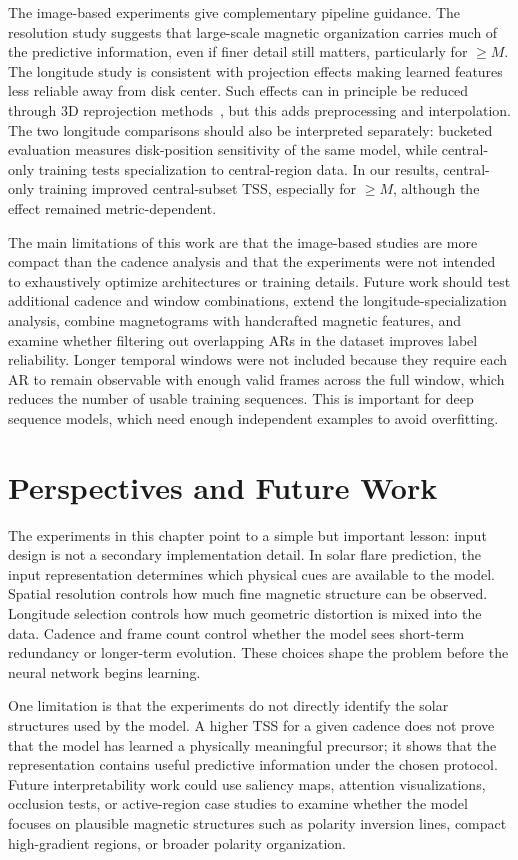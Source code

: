 The image-based experiments give complementary pipeline guidance. The resolution study suggests that large-scale magnetic organization carries much of the predictive information, even if finer detail still matters, particularly for $\geq M$. The longitude study is consistent with projection effects making learned features less reliable away from disk center. Such effects can in principle be reduced through 3D reprojection methods~\cite{ref_brown_walker}, but this adds preprocessing and interpolation. The two longitude comparisons should also be interpreted separately: bucketed evaluation measures disk-position sensitivity of the same model, while central-only training tests specialization to central-region data. In our results, central-only training improved central-subset TSS, especially for $\geq M$, although the effect remained metric-dependent.

The main limitations of this work are that the image-based studies are more compact than the cadence analysis and that the experiments were not intended to exhaustively optimize architectures or training details. Future work should test additional cadence and window combinations, extend the longitude-specialization analysis, combine magnetograms with handcrafted magnetic features, and examine whether filtering out overlapping ARs in the dataset improves label reliability. Longer temporal windows were not included because they require each AR to remain observable with enough valid frames across the full window, which reduces the number of usable training sequences. This is important for deep sequence models, which need enough independent examples to avoid overfitting.

\section{Perspectives and Future Work}

The experiments in this chapter point to a simple but important lesson: input design is not a secondary implementation detail. In solar flare prediction, the input representation determines which physical cues are available to the model. Spatial resolution controls how much fine magnetic structure can be observed. Longitude selection controls how much geometric distortion is mixed into the data. Cadence and frame count control whether the model sees short-term redundancy or longer-term evolution. These choices shape the problem before the neural network begins learning.

One limitation is that the experiments do not directly identify the solar structures used by the model. A higher TSS for a given cadence does not prove that the model has learned a physically meaningful precursor; it shows that the representation contains useful predictive information under the chosen protocol. Future interpretability work could use saliency maps, attention visualizations, occlusion tests, or active-region case studies to examine whether the model focuses on plausible magnetic structures such as polarity inversion lines, compact high-gradient regions, or broader polarity organization.


